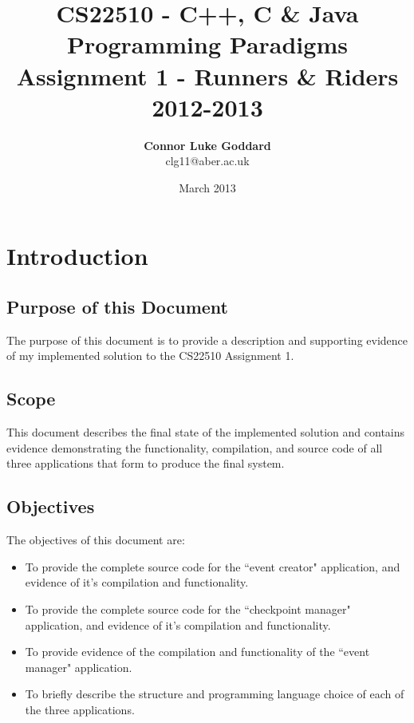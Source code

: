 \documentclass[a4paper, 10pt]{article}
\title{\textbf{CS22510 - C++, C \& Java Programming Paradigms} \\ Assignment 1 - Runners \& Riders \\ 2012-2013}
\author{\textbf{Connor Luke Goddard}\\clg11@aber.ac.uk}
\date{March 2013}
\begin{document}
\begin{titlepage}
\maketitle
\thispagestyle{empty}
\end{titlepage}

\tableofcontents
\clearpage

\section{Introduction}

\subsection{Purpose of this Document}
The purpose of this document is to provide a description and supporting evidence of my implemented solution to the CS22510 Assignment 1. 

\subsection{Scope}
This document describes the final state of the implemented solution and contains  evidence demonstrating the functionality, compilation, and source code of all three applications that form to produce the final system.

\subsection{Objectives}

The objectives of this document are:

\begin{itemize}

\item To provide the complete source code for the ``event creator" application, and evidence of it's compilation and functionality.
\item To provide the complete source code for the ``checkpoint manager" application, and evidence of it's compilation and functionality.
\item To provide evidence of the compilation and functionality of the ``event manager" application.
\item To briefly describe the structure and programming language choice of each of the three applications.

\end{itemize}
\end{document}
